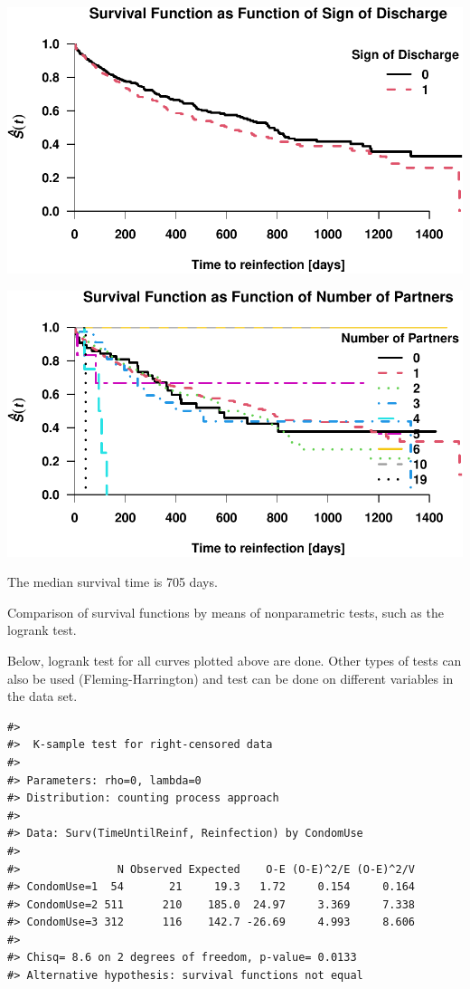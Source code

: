 \documentclass[
]{article}
\begin{document}
\includegraphics{practical_files/figure-latex/unnamed-chunk-4-1.pdf}

\includegraphics{practical_files/figure-latex/unnamed-chunk-5-1.pdf}

The median survival time is 705 days.

Comparison of survival functions by means of nonparametric tests, such as the logrank test.

Below, logrank test for all curves plotted above are done. Other types of tests can also be used (Fleming-Harrington) and test can be done on different variables in the data set.

\begin{verbatim}
#> 
#>  K-sample test for right-censored data
#> 
#> Parameters: rho=0, lambda=0
#> Distribution: counting process approach
#> 
#> Data: Surv(TimeUntilReinf, Reinfection) by CondomUse
#> 
#>               N Observed Expected    O-E (O-E)^2/E (O-E)^2/V
#> CondomUse=1  54       21     19.3   1.72     0.154     0.164
#> CondomUse=2 511      210    185.0  24.97     3.369     7.338
#> CondomUse=3 312      116    142.7 -26.69     4.993     8.606
#> 
#> Chisq= 8.6 on 2 degrees of freedom, p-value= 0.0133
#> Alternative hypothesis: survival functions not equal
\end{verbatim}
\end{document}
